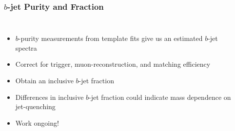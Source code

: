 \begin{frame}
  \frametitle{\textbf{$b$-jet Purity and Fraction}}
  \begin{columns}
    \begin{itemize}
    \item $b$-purity measurements from template fits give us an estimated $b$-jet spectra
    \item Correct for trigger, muon-reconstruction, and matching efficiency
    \item Obtain an inclusive $b$-jet fraction
    \item Differences in inclusive $b$-jet fraction could indicate mass dependence on jet-quenching
    \item Work ongoing!
    \end{itemize}
    \centering

    \

    
  \end{columns}


\end{frame}
